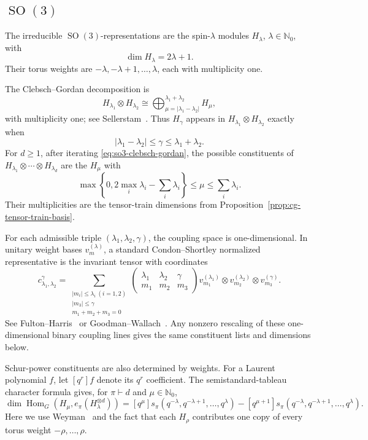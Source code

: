 \documentclass[11pt]{article}
\newcommand{\dsN}{\mathbb{N}}
\newcommand{\HomG}[2]{\operatorname{Hom}_G\!\left(#1,#2\right)}
\newcommand{\SO}{\operatorname{SO}}
\theoremstyle{definition}
\begin{document}
\subsection{\texorpdfstring{$\SO(3)$}{SO(3)}}\label{sec:examples-so3}

The irreducible $\SO(3)$-representations are the spin-$\lambda$ modules $H_\lambda$, $\lambda\in\dsN_0$, with
\[
  \dim H_\lambda=2\lambda+1.
\]
Their torus weights are $-\lambda,-\lambda+1,\dots,\lambda$, each with multiplicity one.

The Clebsch--Gordan decomposition is
\begin{equation}\label{eq:so3-clebsch-gordan}
  H_{\lambda_1}\otimes H_{\lambda_2}
  \cong
  \bigoplus_{\mu=|\lambda_1-\lambda_2|}^{\lambda_1+\lambda_2} H_\mu,
\end{equation}
with multiplicity one; see Sellerstam~\cite[Theorem~23]{Sellerstam2019}. Thus $H_\gamma$ appears in $H_{\lambda_1}\otimes H_{\lambda_2}$ exactly when
\[
  |\lambda_1-\lambda_2|\le\gamma\le\lambda_1+\lambda_2.
\]
For $d\ge 1$, after iterating \eqref{eq:so3-clebsch-gordan}, the possible constituents of $H_{\lambda_1}\otimes\cdots\otimes H_{\lambda_d}$ are the $H_\mu$ with
\[
  \max\!\left\{0,2\max_i\lambda_i-\sum_i\lambda_i\right\}
  \le \mu\le
  \sum_i\lambda_i.
\]
Their multiplicities are the tensor-train dimensions from Proposition~\ref{prop:cg-tensor-train-basis}.

For each admissible triple $(\lambda_1,\lambda_2,\gamma)$, the coupling space is one-dimensional.  In unitary weight bases $v_m^{(\lambda)}$, a standard Condon--Shortley normalized representative is the invariant tensor with coordinates
\begin{equation}\label{eq:so3-wigner-3j}
  c_{\lambda_1,\lambda_2}^{\gamma}
  =
  \sum_{\substack{|m_i|\le \lambda_i\ (i=1,2)\\ |m_3|\le \gamma\\ m_1+m_2+m_3=0}}
  \begin{pmatrix}
    \lambda_1 & \lambda_2 & \gamma\\
    m_1 & m_2 & m_3
  \end{pmatrix}
  v_{m_1}^{(\lambda_1)}
  \otimes
  v_{m_2}^{(\lambda_2)}
    \otimes
    v_{m_3}^{(\gamma)}.
\end{equation}
See Fulton--Harris~\cite[\S4.2]{FH1991} or Goodman--Wallach~\cite[Chapter~8]{GW2009}.  Any nonzero rescaling of these one-dimensional binary coupling lines gives the same constituent lists and dimensions below.

Schur-power constituents are also determined by weights.  For a Laurent polynomial $f$, let $[q^r]f$ denote its $q^r$ coefficient.  The semistandard-tableau character formula gives, for $\pi\vdash d$ and $\mu\in\dsN_0$,
\begin{equation}\label{eq:so3-schur-multiplicity}
  \dim\HomG{H_\mu}{e_\pi(H_\lambda^{\otimes d})}
  =
  [q^\mu]s_\pi\!\left(q^{-\lambda},q^{-\lambda+1},\dots,q^\lambda\right)
  -
  [q^{\mu+1}]s_\pi\!\left(q^{-\lambda},q^{-\lambda+1},\dots,q^\lambda\right).
\end{equation}
Here we use Weyman~\cite[Proposition~2.1.15(b)]{Weyman2003} and the fact that each $H_\rho$ contributes one copy of every torus weight $-\rho,\dots,\rho$.
\end{document}
